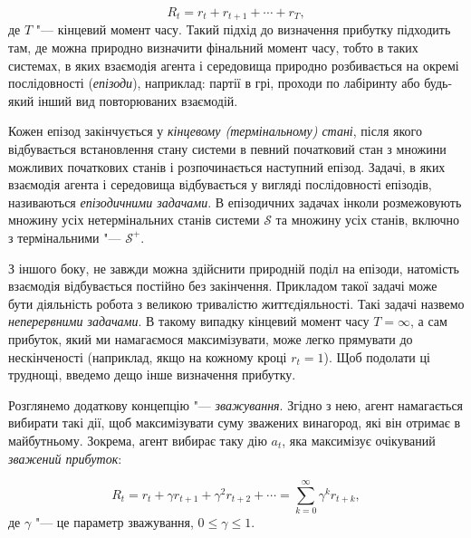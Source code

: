 \documentclass[a4paper,10pt,fleqn]{article}
\begin{document}
\begin{equation}
R_t = r_{t} + r_{t+1} + \cdots + r_T,
\end{equation}
де $T$ "--- кінцевий момент часу. Такий підхід до визначення прибутку підходить там, де можна природно визначити фінальний момент часу, тобто в таких системах, в яких взаємодія агента і середовища природно розбивається на окремі послідовності (\emph{епізоди}), наприклад: партії в грі, проходи по лабіринту або будь-який інший вид повторюваних взаємодій.

Кожен епізод закінчується у \emph{кінцевому (термінальному) стані}, після якого відбувається встановлення стану системи в певний початковий стан з множини можливих початкових станів і розпочинається наступний епізод. Задачі, в яких взаємодія агента і середовища відбувається у вигляді послідовності епізодів, називаються \emph{епізодичними задачами}. В епізодичних задачах інколи розмежовують множину усіх нетермінальних станів системи $\mathcal{S}$ та множину усіх станів, включно з термінальними "--- $\mathcal{S^+}$.

З іншого боку, не завжди можна здійснити природній поділ на епізоди, натомість взаємодія відбувається постійно без закінчення. Прикладом такої задачі може бути діяльність робота з великою тривалістю життєдіяльності. Такі задачі назвемо \emph{неперервними задачами}. В такому випадку кінцевий момент часу $T=\infty$, а сам прибуток, який ми намагаємося максимізувати, може легко прямувати до нескінченості (наприклад, якщо на кожному кроці $r_t=1$). Щоб подолати ці труднощі, введемо дещо інше визначення прибутку.

Розглянемо додаткову концепцію "--- \emph{зважування}. Згідно з нею, агент намагається вибирати такі дії, щоб максимізувати суму зважених винагород, які він отримає в майбутньому. Зокрема, агент вибирає таку дію $a_t$, яка максимізує очікуваний \emph{зважений прибуток}:

\begin{equation}
R_t = r_{t} + \gamma r_{t+1} + \gamma^2 r_{t+2} + \cdots = \sum_{k=0}^{\infty}\gamma^k r_{t+k},
\end{equation}
де $\gamma$ "--- це параметр зважування, $0\leq\gamma\leq 1$.
\end{document}
